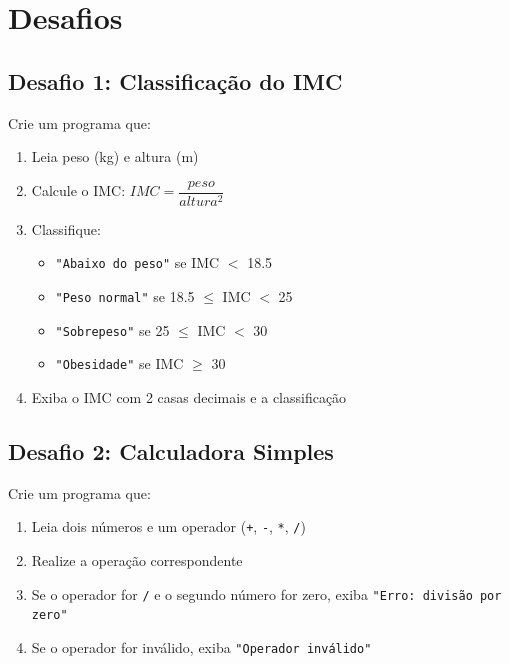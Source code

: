 \documentclass[12pt]{article}
\begin{document}
\section*{Desafios}

\begin{desafiobox}
\subsection*{Desafio 1: Classificação do IMC}
Crie um programa que:
\begin{enumerate}
    \item Leia peso (kg) e altura (m)
    \item Calcule o IMC: $IMC = \dfrac{peso}{altura^2}$
    \item Classifique:
    \begin{itemize}
        \item \texttt{"Abaixo do peso"} se IMC $<$ 18.5
        \item \texttt{"Peso normal"} se 18.5 $\leq$ IMC $<$ 25
        \item \texttt{"Sobrepeso"} se 25 $\leq$ IMC $<$ 30
        \item \texttt{"Obesidade"} se IMC $\geq$ 30
    \end{itemize}
    \item Exiba o IMC com 2 casas decimais e a classificação
\end{enumerate}

\subsection*{Desafio 2: Calculadora Simples}
Crie um programa que:
\begin{enumerate}
    \item Leia dois números e um operador (\texttt{+}, \texttt{-}, \texttt{*}, \texttt{/})
    \item Realize a operação correspondente
    \item Se o operador for \texttt{/} e o segundo número for zero, exiba \texttt{"Erro: divisão por zero"}
    \item Se o operador for inválido, exiba \texttt{"Operador inválido"}
\end{enumerate}
\end{desafiobox}
\end{document}
